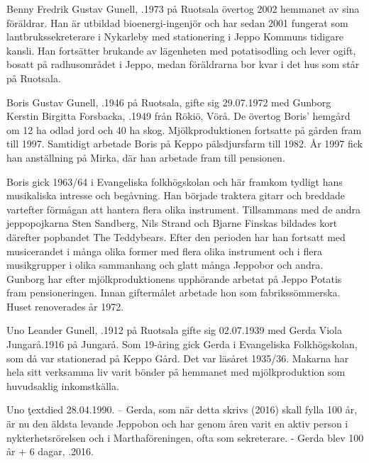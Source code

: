 
Benny Fredrik Gustav Gunell, .1973 på Ruotsala övertog 2002 hemmanet av sina föräldrar. Han är utbildad bioenergi-ingenjör och har sedan 2001 fungerat som lantbrukssekreterare i Nykarleby med stationering i Jeppo Kommuns tidigare kansli. Han fortsätter brukande av lägenheten med potatisodling  och lever ogift, bosatt på radhusområdet i Jeppo, medan föräldrarna bor kvar i det hus som står på Ruotsala.

Boris Gustav Gunell, .1946 på Ruotsala, gifte sig 29.07.1972 med Gunborg Kerstin Birgitta Forsbacka, .1949 från Rökiö, Vörå. De övertog Boris' hemgård om 12 ha odlad jord och 40 ha skog. Mjölkproduktionen fortsatte på gården fram till 1997. Samtidigt arbetade Boris på Keppo pälsdjursfarm till 1982. År 1997 fick han anställning på Mirka, där han arbetade fram till pensionen.

Boris gick 1963/64 i Evangeliska folkhögskolan och här framkom tydligt hans musikaliska intresse och begåvning. Han började traktera gitarr och breddade vartefter förmågan att hantera flera olika instrument. Tillsammans med de andra jeppopojkarna Sten Sandberg, Nils Strand och Bjarne Finskas bildades kort därefter popbandet The Teddybears. Efter den perioden har han fortsatt med musicerandet i många	olika former med flera olika instrument och i flera musikgrupper i 	olika sammanhang och glatt många Jeppobor och andra. Gunborg har efter mjölkproduktionens upphörande arbetat på Jeppo Potatis fram pensioneringen. Innan giftermålet arbetade hon som fabrikssömmerska. Huset renoverades år 1972.
\begin{jhchildren}
  \item {}
  \item {}
\end{jhchildren}


Uno Leander Gunell, .1912 på Ruotsala gifte sig 02.07.1939 med Gerda Viola Jungarå.1916 på Jungarå. Som 19-åring gick Gerda i Evangeliska Folkhögskolan, som då var stationerad på Keppo Gård. Det var läsåret 1935/36. Makarna har hela sitt verksamma liv varit bönder på hemmanet med mjölkproduktion som huvudsaklig inkomstkälla.
\begin{jhchildren}
  \item {}
  \item {}
\end{jhchildren}
Uno ţextdied 28.04.1990. --  Gerda, som när detta skrivs (2016) skall fylla 100 år, är nu den äldsta levande Jeppobon och har genom åren varit en aktiv person i nykterhetsrörelsen och i Marthaföreningen, ofta som sekreterare. - Gerda blev 100 år + 6 dagar, .2016.



